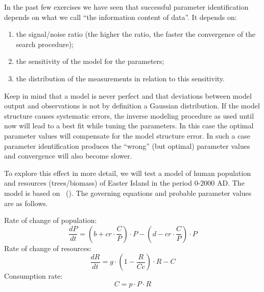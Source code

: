 In the past few exercises we have seen that successful parameter identification
depends on what we call ``the information content of data''. It depends on:
\begin{enumerate}
\item{the signal/noise ratio (the higher the ratio, the faster the convergence
of the search procedure);}
\item{the sensitivity of the model for the parameters;}
\item{the distribution of the measurements in relation to this sensitivity.}
\end{enumerate}

Keep in mind that a model is never perfect and that deviations between model
output and observations is not by definition a Gaussian distribution. If the
model structure causes systematic errors, the inverse modeling procedure as used
until now will lead to a best fit while tuning the parameters. In this case the
optimal parameter values will compensate for the model structure error. In such
a case parameter identification produces the ``wrong'' (but optimal) parameter
values and convergence will also become slower.

To explore this effect in more detail, we will test a model of human population
and resources (trees/biomass) of Easter Island in the period 0-2000 AD. The
model is based on \citeauthor*{bran-tayl1998}~(\citeyear{bran-tayl1998}). The
governing equations and probable parameter values are as follows.


Rate of change of population:
\begin{equation}
\frac{dP}{dt} = (b+cr\cdot{}\frac{C}{P})\cdot{}P-(d-cr\cdot{}\frac{C}{P})\cdot{P}
\end{equation}
Rate of change of resources:
\begin{equation}
\frac{dR}{dt} = g\cdot{}(1-\frac{R}{Cc})\cdot{}R-C
\end{equation}
Consumption rate:
\begin{equation}
C = p\cdot{}P\cdot{}R
\end{equation}

